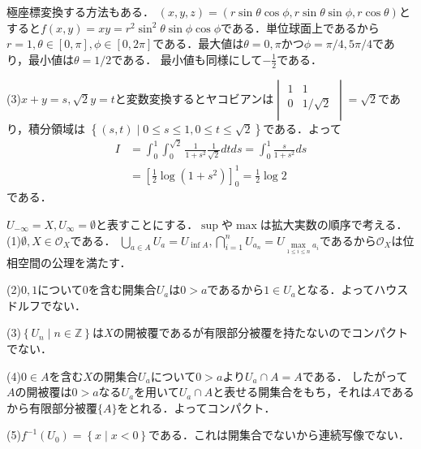\documentclass[
		book,
		head_space=20mm,
		foot_space=20mm,
		gutter=10mm,
		line_length=190mm
]{jlreq}
\begin{document}
            \begin{tcolorbox}[blanker,breakable,
                left=3mm,right=3mm,
                top=3mm,bottom=3mm,
                before skip=15pt,after skip=15pt,
                borderline vertical={1pt}{0pt}{black,dotted}]
                極座標変換する方法もある．
                $(x,y,z)=(r \sin \theta \cos \phi,r \sin \theta \sin \phi,r \cos \theta)$とすると$f(x,y)=xy=r^2 \sin^2 \theta \sin \phi \cos \phi$である．単位球面上であるから$r=1,\theta \in [0,\pi],\phi \in [0,2\pi]$である．最大値は$\theta=0,\pi $かつ$\phi=\pi/4,5\pi/4$であり，最小値は$\theta=1/2$である．
                最小値も同様にして$-\frac{1}{2}$である．
                \end{tcolorbox}



            (3)$x+y=s,\sqrt{2}y=t$と変数変換するとヤコビアンは$\begin{vmatrix}
                1 & 1 \\
                0 & 1/\sqrt{2} \\
            \end{vmatrix}=\sqrt{2}$であり，積分領域は
            $\left\{ (s,t) \mid 0\le s \le 1,0\le t \le \sqrt{2} \right\}$である．よって
            \begin{align}
                I&=\int_0^1\int_0^{\sqrt{2}} \frac{1}{1+s^2} \frac{1}{\sqrt{2}}dtds=\int_0^1 \frac{s}{1+s^2}ds \\
                &=\left[ \frac{1}{2}\log (1+s^2) \right]_0^1=\frac{1}{2}\log 2
            \end{align}である．


    $U_{-\infty}=X,U_{\infty}=\emptyset$と表すことにする．$\sup$や$\max$は拡大実数の順序で考える．
    (1)$\emptyset,X \in \mathcal{O}_X$である．
    $\bigcup\limits_{a \in A}U_a=U_{\inf A},\bigcap\limits_{i=1}^n U_{a_n}=U_{\max\limits_{1 \le i \le n}a_i}$であるから$\mathcal{O}_X$は位相空間の公理を満たす．
    
    (2)$0,1$について$0$を含む開集合$U_a$は$0>a$であるから$1\in U_a$となる．よってハウスドルフでない．

    (3)$\left\{ U_n \mid n \in \mathbb{Z} \right\}$は$X$の開被覆であるが有限部分被覆を持たないのでコンパクトでない．

    (4)$0 \in A$を含む$X$の開集合$U_a$について$0 >a$より$U_a \cap A=A$である．
    したがって$A$の開被覆は$0 > a$なる$U_a$を用いて$U_a \cap A$と表せる開集合をもち，それは$A$であるから有限部分被覆$\{A\}$をとれる．よってコンパクト．

    (5)$f^{-1}(U_0)=\left\{ x\mid x < 0 \right\}$である．これは開集合でないから連続写像でない．
\end{document}

